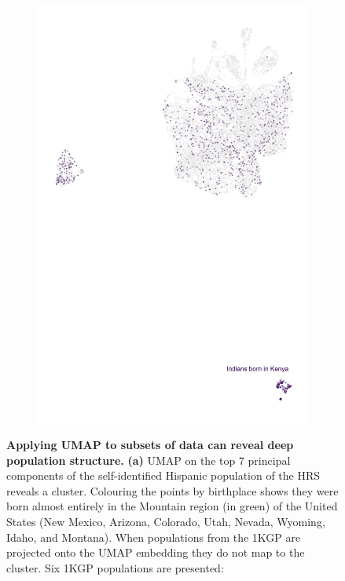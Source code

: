 \documentclass[12pt]{pnas-new}
\begin{document}
\begin{figure}
\begin{subfigure}{0.49\columnwidth}
    \includegraphics[width=\columnwidth]{images/Asthma_FullAsian_PC_QC_new_UMAP_PC5_NC2_NN15_MD05_201931173256_ethcob.jpeg}
    \caption{}
        \label{fig:umap_ukbb_indian}
    \end{subfigure}
    \caption{\textbf{Applying UMAP to subsets of data can reveal deep population structure.} \textbf{(a)} UMAP on the top $7$ principal components of the self-identified Hispanic population of the HRS reveals a cluster. Colouring the points by birthplace shows they were born almost entirely in the Mountain region (in green) of the United States (New Mexico, Arizona, Colorado, Utah, Nevada, Wyoming, Idaho, and Montana). When populations from the 1KGP are projected onto the UMAP embedding they do not map to the cluster. Six 1KGP populations are presented:
}
\end{figure}
\end{document}
